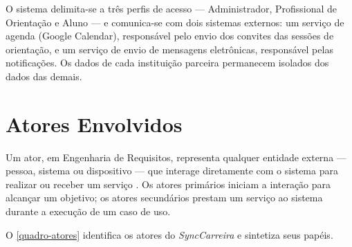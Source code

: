O sistema delimita-se a três perfis de acesso — Administrador, Profissional de Orientação e Aluno — e comunica-se com dois sistemas externos: um serviço de agenda (Google Calendar), responsável pelo envio dos convites das sessões de orientação, e um serviço de envio de mensagens eletrônicas, responsável pelas notificações. Os dados de cada instituição parceira permanecem isolados dos dados das demais.

\section{Atores Envolvidos}\label{sec:atores}

Um ator, em Engenharia de Requisitos, representa qualquer entidade externa — pessoa, sistema ou dispositivo — que interage diretamente com o sistema para realizar ou receber um serviço \cite{pressman2021}. Os atores primários iniciam a interação para alcançar um objetivo; os atores secundários prestam um serviço ao sistema durante a execução de um caso de uso.

O \autoref{quadro-atores} identifica os atores do \textit{SyncCarreira} e sintetiza seus papéis.

